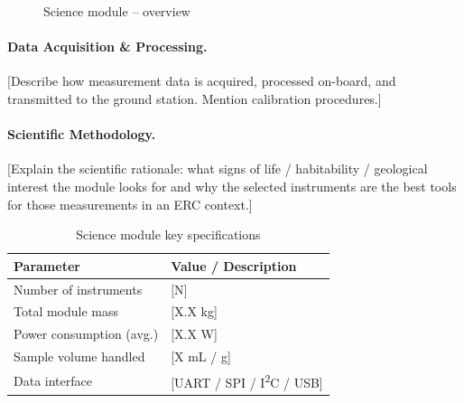 \begin{figure}[H]
    \centering
    \caption{Science module -- overview}
    \label{fig:science_module}
\end{figure}

\paragraph{Data Acquisition \& Processing.}
[Describe how measurement data is acquired, processed on-board, and transmitted
to the ground station. Mention calibration procedures.]

\paragraph{Scientific Methodology.}
[Explain the scientific rationale: what signs of life / habitability / geological
interest the module looks for and why the selected instruments are the best
tools for those measurements in an ERC context.]

\begin{table}[H]
    \centering
    \caption{Science module key specifications}
    \label{tab:science_specs}
    \begin{tabular}{L{5cm} L{7cm}}
        \toprule
        \textbf{Parameter}         & \textbf{Value / Description} \\
        \midrule
        Number of instruments      & [N] \\
        Total module mass          & [X.X kg] \\
        Power consumption (avg.)   & [X.X W] \\
        Sample volume handled      & [X mL / g] \\
        Data interface             & [UART / SPI / I\textsuperscript{2}C / USB] \\
        \bottomrule
    \end{tabular}
\end{table}
